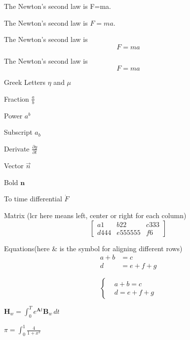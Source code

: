 \documentclass{article}
\begin{document}
 
  The Newton's second law is F=ma. 

  The Newton's second law is $F=ma$. 

  The Newton's second law is 
  $$F=ma$$ 

  The Newton's second law is 
  \[F=ma\] 

  Greek Letters $\eta$ and $\mu$ 

  Fraction $\frac{a}{b}$ 

  Power $a^b$ 

  Subscript $a_b$ 

  Derivate $\frac{\partial y}{\partial t} $ 

  Vector $\vec{n}$ 

  Bold $\mathbf{n}$ 

  To time differential $\dot{F}$ 

  Matrix (lcr here means left, center or right for each column) 
  \[ 
    \left[ 
      \begin{array}{lcr} 
        a1 & b22 & c333 \\ 
        d444 & e555555 & f6 
      \end{array} 
    \right] 
  \] 

Equations(here \& is the symbol for aligning different rows) 
\begin{align} 
  a+b&=c\\ 
  d&=e+f+g 
\end{align} 

\[ 
  \left\{ 
    \begin{aligned} 
      &a+b=c\\ 
      &d=e+f+g 
    \end{aligned} 
  \right. 
\] 

$\textbf{H}_{w}=\int_{0}^{T}e^{\textbf{A}t}\textbf{B}_{w}\,dt$

$\pi = \int_{0}^{1}{\frac{4}{1+x^2}}$
\end{document}
